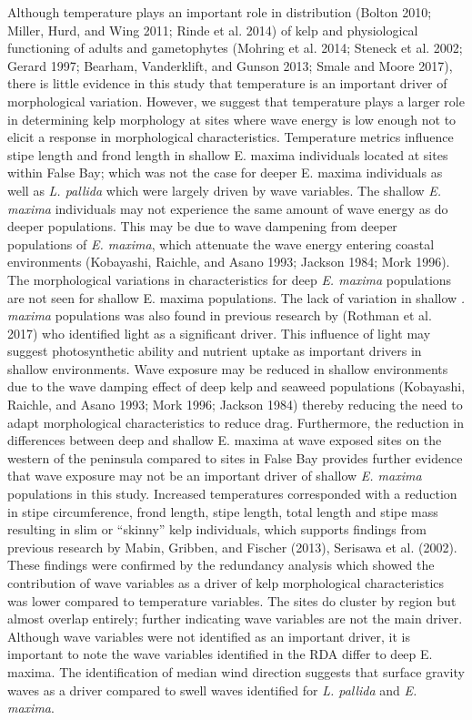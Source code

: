 \documentclass[
  a4paper,
]{article}
\begin{document}
Although temperature plays an important role in distribution (Bolton
2010; Miller, Hurd, and Wing 2011; Rinde et al. 2014) of kelp and
physiological functioning of adults and gametophytes (Mohring et al.
2014; Steneck et al. 2002; Gerard 1997; Bearham, Vanderklift, and Gunson
2013; Smale and Moore 2017), there is little evidence in this study that
temperature is an important driver of morphological variation. However,
we suggest that temperature plays a larger role in determining kelp
morphology at sites where wave energy is low enough not to elicit a
response in morphological characteristics. Temperature metrics influence
stipe length and frond length in shallow E. maxima individuals located
at sites within False Bay; which was not the case for deeper E. maxima
individuals as well as \emph{L. pallida} which were largely driven by
wave variables. The shallow \emph{E. maxima} individuals may not
experience the same amount of wave energy as do deeper populations. This
may be due to wave dampening from deeper populations of \emph{E.
maxima}, which attenuate the wave energy entering coastal environments
(Kobayashi, Raichle, and Asano 1993; Jackson 1984; Mork 1996). The
morphological variations in characteristics for deep \emph{E. maxima}
populations are not seen for shallow E. maxima populations. The lack of
variation in shallow \emph{. maxima} populations was also found in
previous research by (Rothman et al. 2017) who identified light as a
significant driver. This influence of light may suggest photosynthetic
ability and nutrient uptake as important drivers in shallow
environments. Wave exposure may be reduced in shallow environments due
to the wave damping effect of deep kelp and seaweed populations
(Kobayashi, Raichle, and Asano 1993; Mork 1996; Jackson 1984) thereby
reducing the need to adapt morphological characteristics to reduce drag.
Furthermore, the reduction in differences between deep and shallow E.
maxima at wave exposed sites on the western of the peninsula compared to
sites in False Bay provides further evidence that wave exposure may not
be an important driver of shallow \emph{E. maxima} populations in this
study. Increased temperatures corresponded with a reduction in stipe
circumference, frond length, stipe length, total length and stipe mass
resulting in slim or ``skinny'' kelp individuals, which supports
findings from previous research by Mabin, Gribben, and Fischer (2013),
Serisawa et al. (2002). These findings were confirmed by the redundancy
analysis which showed the contribution of wave variables as a driver of
kelp morphological characteristics was lower compared to temperature
variables. The sites do cluster by region but almost overlap entirely;
further indicating wave variables are not the main driver. Although wave
variables were not identified as an important driver, it is important to
note the wave variables identified in the RDA differ to deep E. maxima.
The identification of median wind direction suggests that surface
gravity waves as a driver compared to swell waves identified for
\emph{L. pallida} and \emph{E. maxima}.
\end{document}
